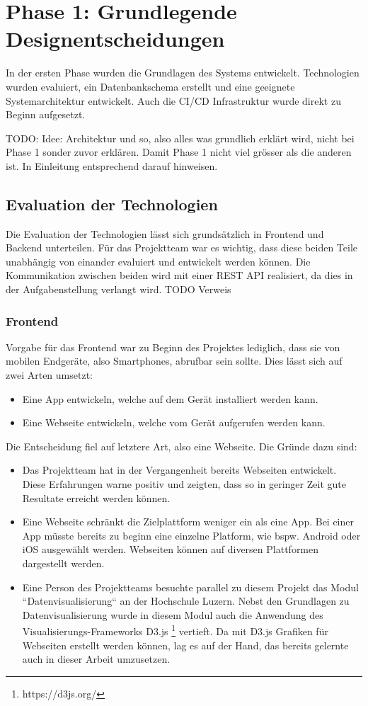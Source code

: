 \section{Phase 1: Grundlegende Designentscheidungen}
In der ersten Phase wurden die Grundlagen des Systems entwickelt.
Technologien wurden evaluiert, ein Datenbankschema erstellt und eine geeignete Systemarchitektur entwickelt.
Auch die \ac{CI/CD} Infrastruktur wurde direkt zu Beginn aufgesetzt.

TODO: Idee: Architektur und so, also alles was grundlich erklärt wird, nicht bei Phase 1 sonder zuvor erklären.
Damit Phase 1 nicht viel grösser als die anderen ist. In Einleitung entsprechend darauf hinweisen.

\subsection{Evaluation der Technologien}
\label{p1:evaluation_tech}
Die Evaluation der Technologien lässt sich grundsätzlich in Frontend und Backend unterteilen.
Für das Projektteam war es wichtig, dass diese beiden Teile unabhängig von einander evaluiert und entwickelt werden können.
Die Kommunikation zwischen beiden wird mit einer \ac{REST} \ac{API} realisiert, da dies in der Aufgabenstellung verlangt wird. TODO Verweis

\subsubsection{Frontend}
Vorgabe für das Frontend war zu Beginn des Projektes lediglich,
dass sie von mobilen Endgeräte, also Smartphones, abrufbar sein sollte.
Dies lässt sich auf zwei Arten umsetzt:
\begin{itemize}
    \item Eine App entwickeln, welche auf dem Gerät installiert werden kann.
    \item Eine Webseite entwickeln, welche vom Gerät aufgerufen werden kann.
\end{itemize}
Die Entscheidung fiel auf letztere Art, also eine Webseite.
Die Gründe dazu sind:
\begin{itemize}
    \item Das Projektteam hat in der Vergangenheit bereits Webseiten entwickelt.
          Diese Erfahrungen warne positiv und zeigten, dass so in geringer Zeit gute Resultate erreicht werden können.
    \item Eine Webseite schränkt die Zielplattform weniger ein als eine App.
          Bei einer App müsste bereits zu beginn eine einzelne Platform, wie bspw. Android oder iOS ausgewählt werden.
          Webseiten können auf diversen Plattformen dargestellt werden.
    \item Eine Person des Projektteams besuchte parallel zu diesem Projekt das Modul ``Datenvisualisierung``  an der Hochschule Luzern.
          Nebst den Grundlagen zu Datenvisualisierung wurde in diesem Modul auch die Anwendung des Visualisierungs-Frameworks D3.js \footnote{https://d3js.org/} vertieft.
          Da mit D3.js Grafiken für Webseiten erstellt werden können, lag es auf der Hand, das bereits gelernte auch in dieser Arbeit umzusetzen.
\end{itemize}

